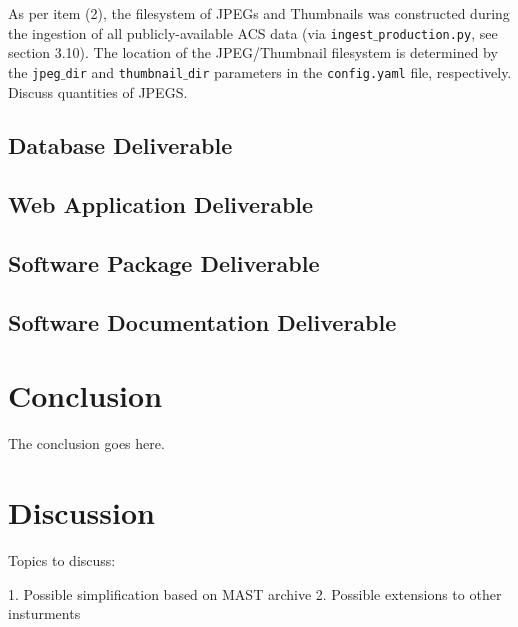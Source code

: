 \documentclass[10pt,journal,compsoc]{IEEEtran}
\begin{document}

As per item (2), the filesystem of JPEGs and Thumbnails was constructed during the ingestion of all publicly-available
ACS data (via \texttt{ingest$\_$production.py}, see section 3.10).  The location of the JPEG/Thumbnail filesystem is determined
by the \texttt{jpeg$\_$dir} and \texttt{thumbnail$\_$dir} parameters in the \texttt{config.yaml} file, respectively.
Discuss quantities of JPEGS.


\subsection{Database Deliverable}


\subsection{Web Application Deliverable}


\subsection{Software Package Deliverable}


\subsection{Software Documentation Deliverable}


\section{Conclusion}\label{sec:conclusion}
The conclusion goes here.

\section{Discussion}\label{sec:discussion}
Topics to discuss:

1. Possible simplification based on MAST archive
2. Possible extensions to other insturments

\ifCLASSOPTIONcompsoc
\end{document}
